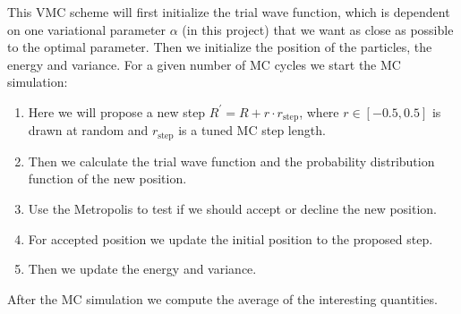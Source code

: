 \documentclass[12pt,a4paper,english]{article}
\begin{document}
This VMC scheme will first initialize the trial wave function, which is dependent on one variational parameter $\alpha$ (in this project) that we want as close as possible to the optimal parameter. Then we initialize the position of the particles, the energy and variance. For a given number of MC cycles we start the MC simulation:
\begin{enumerate}
	\item Here we will propose a new step $R^{\prime}=R+r\cdot r_{\text{step}}$, where $r\in[-0.5,0.5]$ is drawn at random and $r_{\text{step}}$ is a tuned MC step length. 
	\item Then we calculate the trial wave function and the probability distribution function of the new position.
	\item Use the Metropolis to test if we should accept or decline the new position.
	\item For accepted position we update the initial position to the proposed step.
	\item Then we update the energy and variance.
\end{enumerate} 
After the MC simulation we compute the average of the interesting quantities. 
\end{document}
